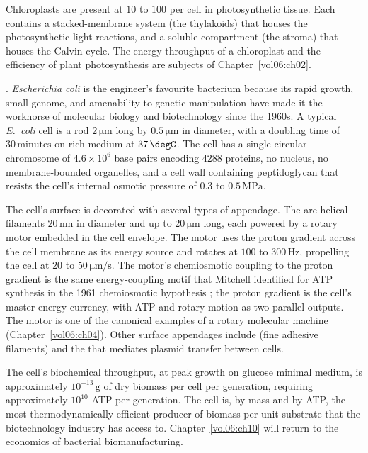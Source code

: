 Chloroplasts are present at $10$ to $100$ per cell in photosynthetic
tissue. Each contains a stacked-membrane system (the thylakoids) that
houses the photosynthetic light reactions, and a soluble compartment
(the stroma) that houses the Calvin cycle. The energy throughput of a
chloroplast and the efficiency of plant photosynthesis are subjects
of Chapter~\ref{vol06:ch02}.

. \emph{Escherichia
coli} is the engineer's favourite bacterium because its rapid growth,
small genome, and amenability to genetic manipulation have made it
the workhorse of molecular biology and biotechnology since the 1960s.
A typical \emph{E.~coli} cell is a rod $2\,\si{\micro\meter}$ long
by $0.5\,\si{\micro\meter}$ in diameter, with a doubling time of
$30\,\text{minutes}$ on rich medium at $37\,\degC$. The cell has a
single circular chromosome of $4.6 \times 10^6$ base pairs encoding
$4288$ proteins, no nucleus, no membrane-bounded organelles, and a
cell wall containing peptidoglycan that resists the cell's internal
osmotic pressure of $0.3$ to $0.5\,\text{MPa}$.

The cell's surface is decorated with several types of appendage. The
 are helical filaments $20\,\text{nm}$ in diameter
and up to $20\,\si{\micro\meter}$ long, each powered by a rotary
motor embedded in the cell envelope. The motor uses the proton
gradient across the cell membrane as its energy source and rotates at
$100$ to $300\,\text{Hz}$, propelling the cell at $20$ to
$50\,\si{\micro\meter}/\text{s}$. The motor's chemiosmotic coupling
to the proton gradient is the same energy-coupling motif that
Mitchell identified for ATP synthesis in the 1961 chemiosmotic
hypothesis \cite{paper:v6c01-mitchell-1961}; the proton gradient is
the cell's master energy currency, with ATP and rotary motion as two
parallel outputs. The motor is one of the canonical examples of a
rotary molecular machine (Chapter~\ref{vol06:ch04}). Other surface
appendages include  (fine adhesive filaments) and the
 that mediates plasmid transfer between cells.

The cell's biochemical throughput, at peak growth on glucose minimal
medium, is approximately $10^{-13}\,\text{g}$ of dry biomass per
cell per generation, requiring approximately $10^{10}$ ATP per
generation. The cell is, by mass and by ATP, the most thermodynamically
efficient producer of biomass per unit substrate that the biotechnology
industry has access to. Chapter~\ref{vol06:ch10} will return to the
economics of bacterial biomanufacturing.

